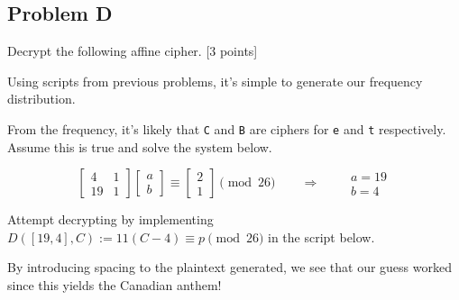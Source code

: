 \documentclass[../hw_sols.tex]{subfiles}
\begin{document}
\subsection*{Problem D}
Decrypt the following affine cipher. [3 points]



\begin{solution}
Using scripts from previous problems, it's simple to generate our frequency distribution.


\noindent From the frequency, it's likely that \verb|C| and \verb|B| are ciphers for \verb|e| and \verb|t| respectively. Assume this is true and solve the system below.

	$$\begin{bmatrix}
		4 & 1 \\ 19 & 1
	\end{bmatrix}
	\begin{bmatrix}
		a \\ b
	\end{bmatrix}
	\equiv
	\begin{bmatrix}
		2 \\ 1
	\end{bmatrix}
	\pmod{26} 
	\qquad \Rightarrow \qquad
	\begin{matrix}
		a = 19 \\ b = 4
	\end{matrix}$$

\noindent Attempt decrypting by implementing $D([19,4],C) := 11(C-4) \equiv p \pmod{26}$ in the script below.



\noindent By introducing spacing to the plaintext generated, we see that our guess worked since this yields the Canadian anthem!


\end{solution}
\end{document}
